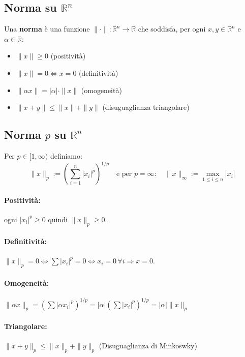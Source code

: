 \documentclass[12pt,a4paper]{article}
\begin{document}
\subsection*{Norma su $\mathbb{R}^n$}

Una \textbf{norma} è una funzione $\|\cdot\| : \mathbb{R}^n \to \mathbb{R}$ che soddisfa, per ogni $x,y \in \mathbb{R}^n$ e $\alpha \in \mathbb{R}$:

\begin{itemize}
  \item $\|x\| \ge 0$ (positività)
  \item $\|x\| = 0 \Leftrightarrow x = 0$ (definitività)
  \item $\|\alpha x\| = |\alpha| \cdot \|x\|$ (omogeneità)
  \item $\|x + y\| \le \|x\| + \|y\|$ (disuguaglianza triangolare)
\end{itemize}

\subsection*{Norma $p$ su $\mathbb{R}^n$}

Per $p \in [1, \infty)$ definiamo:
\[
\|x\|_p := \left( \sum_{i=1}^n |x_i|^p \right)^{1/p}
\quad \text{e per } p = \infty: \quad
\|x\|_\infty := \max_{1 \le i \le n} |x_i|
\]

\paragraph{Positività:} ogni $|x_i|^p \ge 0$ quindi $\|x\|_p \ge 0$.

\paragraph{Definitività:} $\|x\|_p = 0 \Leftrightarrow \sum |x_i|^p = 0 \Leftrightarrow x_i = 0 \, \forall i \Rightarrow x = 0$.

\paragraph{Omogeneità:}

$\|\alpha x\|_p = \left( \sum |\alpha x_i|^p \right)^{1/p} = |\alpha| \left( \sum |x_i|^p \right)^{1/p} = |\alpha| \|x\|_p$


\paragraph{Triangolare:} 
$
\|x + y\|_p \le \|x\|_p + \|y\|_p
$ (Disuguaglianza di Minkoswky)
\end{document}
